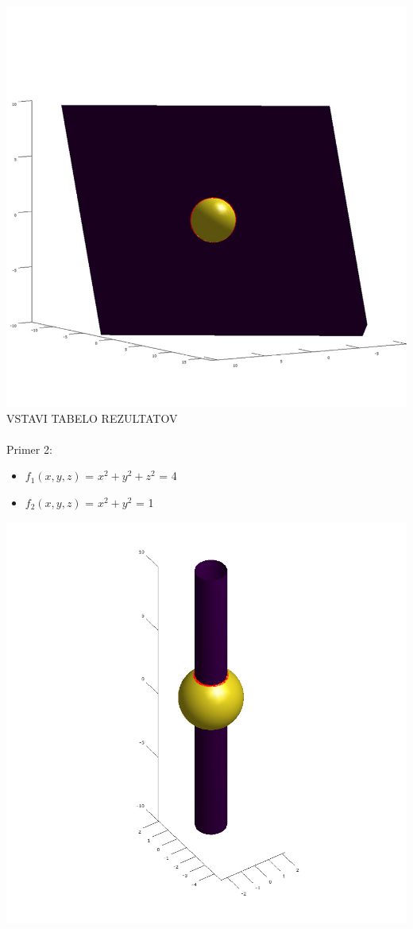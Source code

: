 \documentclass[]{article}
\begin{document}
	\includegraphics[scale=0.3]{primer1_2}
	VSTAVI TABELO REZULTATOV\\ \\
	Primer 2:
	\begin{itemize}  
		\item $f_{1}(x,y,z)$ = $x^2 + y^2 + z^2$ = 4
		\item $f_{2}(x,y,z)$ = $x^2 + y^2$ = 1
	\end{itemize}
	\includegraphics[scale=0.3]{primer2_1}
\end{document}
